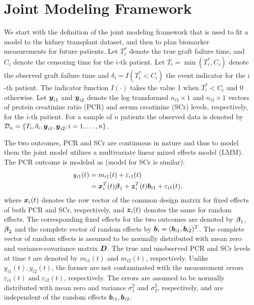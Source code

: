 
\section{Joint Modeling Framework}
\label{sec : jm_framework}
We start with the definition of the joint modeling framework that is used to fit a model to the kidney transplant dataset, and then to plan biomarker measurements for future patients. Let $T_i^*$ denote the true graft failure time, and $C_i$ denote the censoring time for the $i$-th patient. Let $T_i = \min(T^*_i, C_i)$ denote the observed graft failure time and $\delta_i = I(T^*_i < C_i)$ the event indicator for the $i$-th patient. The indicator function $I(\cdot)$ takes the value 1 when $T^*_i < C_i$ and 0 otherwise. Let $\boldsymbol{y}_{i1}$ and $\boldsymbol{y}_{i2}$ denote the log transformed $n_{i1} \times 1$ and $n_{i2} \times 1$ vectors of protein creatinine ratio (PCR) and serum creatinine (SCr) levels, respectively, for the $i$-th patient. For a sample of $n$ patients the observed data is denoted by $\mathcal{D}_n = \{T_i, \delta_i, \boldsymbol{y}_{i1}, \boldsymbol{y}_{i2}; i = 1, \ldots, n\}$.

The two outcomes, PCR and SCr are continuous in nature and thus to model them the joint model utilizes a multivariate linear mixed effects model (LMM). The PCR outcome is modeled as (model for SCr is similar):
\begin{equation*}
\begin{split}
y_{i1}(t) &= m_{i1}(t) + \varepsilon_{i1}(t)\\
&=\boldsymbol{x}_{i}^T(t) \boldsymbol{\beta}_1 + \boldsymbol{z}_{i}^T(t) \boldsymbol{b}_{i1} + \varepsilon_{i1}(t),
\end{split}
\end{equation*}
where $\boldsymbol{x}_{i}(t)$ denotes the row vector of the common design matrix for fixed effects of both PCR and SCr, respectively, and $\boldsymbol{z}_{i}(t)$ denotes the same for random effects. The corresponding fixed effects for the two outcomes are denoted by $\boldsymbol{\beta}_1$, $\boldsymbol{\beta}_2$ and the complete vector of random effects by $\boldsymbol{b}_i = (\boldsymbol{b}_{i1}, \boldsymbol{b}_{i2})^T$. The complete vector of random effects is assumed to be normally distributed with mean zero and variance-covariance matrix $\boldsymbol{D}$. The true and unobserved PCR and SCr levels at time $t$ are denoted by $m_{i1}(t)$ and $m_{i2}(t)$, respectively. Unlike $y_{i1}(t), y_{i2}(t)$, the former are not contaminated with the measurement errors $\varepsilon_{i1}(t)$ and $\varepsilon_{i2}(t)$, respectively. The errors are assumed to be normally distributed with mean zero and variance $\sigma_1^2$ and $\sigma_2^2$, respectively, and are independent of the random effects $\boldsymbol{b}_{i1}, \boldsymbol{b}_{i2}$.

